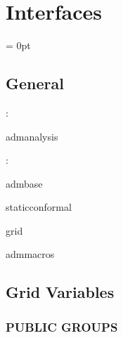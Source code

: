 
\section{Interfaces} 


\parskip = 0pt

\vspace{3mm} \subsection*{General}

: 

admanalysis
\vspace{2mm}

: 

admbase

staticconformal

grid

admmacros
\vspace{2mm}
\subsection*{Grid Variables}
\vspace{5mm}\subsubsection{PUBLIC GROUPS}

\vspace{5mm}

